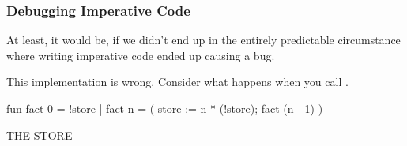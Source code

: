 \documentclass[aspectratio=169]{beamer}
\begin{document}
\begin{frame}[fragile]
  \frametitle{Debugging Imperative Code}

  \begin{minipage}[t][0.6in][t]{\textwidth}
  At least, it would be, if we didn't end up in the entirely predictable
  circumstance where writing imperative code ended up causing a bug.

  \pause
  \vspace{\fill}

  This  implementation is wrong. Consider what happens when you call
  .
  \end{minipage}

  \pause
  \vspace{10pt}

  \begin{center}
    \begin{minipage}[t][1.7in][t]{0.6\textwidth}
      \vspace{\fill}
      \begin{codeblock}
        fun fact 0 = !store
          | fact n =
              ( store := n * (!store);
                fact (n - 1)
              )
      \end{codeblock}
      \vspace{\fill}
    \end{minipage}
    \hfill\vline\hfill
    \begin{minipage}[t][1.7in][t]{0.3\textwidth}
      \centering
      {\hspace{-20pt}\color{gray} \large THE STORE}

      \vspace{\fill}
      \vspace{\fill}
    \end{minipage}
  \end{center}
\end{frame}
\end{document}
